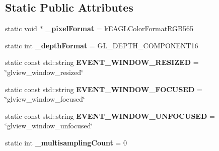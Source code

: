 \subsection*{Static Public Attributes}
\begin{DoxyCompactItemize}
\item 
\mbox{\label{classGLViewImpl_a58e891f79874473b8153a72b04abca33}} 
static void $\ast$ {\bfseries \+\_\+pixel\+Format} = k\+E\+A\+G\+L\+Color\+Format\+R\+G\+B565
\item 
\mbox{\label{classGLViewImpl_ab76f89c8481566f2bd75550cba3edf02}} 
static int {\bfseries \+\_\+depth\+Format} = G\+L\+\_\+\+D\+E\+P\+T\+H\+\_\+\+C\+O\+M\+P\+O\+N\+E\+N\+T16
\item 
\mbox{\label{classGLViewImpl_a90c8299506c7430f38bd9f8602b1ae82}} 
static const std\+::string {\bfseries E\+V\+E\+N\+T\+\_\+\+W\+I\+N\+D\+O\+W\+\_\+\+R\+E\+S\+I\+Z\+ED} = \char`\"{}glview\+\_\+window\+\_\+resized\char`\"{}
\item 
\mbox{\label{classGLViewImpl_aaacceb861875d2fca65f9d213aca00d8}} 
static const std\+::string {\bfseries E\+V\+E\+N\+T\+\_\+\+W\+I\+N\+D\+O\+W\+\_\+\+F\+O\+C\+U\+S\+ED} = \char`\"{}glview\+\_\+window\+\_\+focused\char`\"{}
\item 
\mbox{\label{classGLViewImpl_ae81b16579d07b45d06a8225272798a0e}} 
static const std\+::string {\bfseries E\+V\+E\+N\+T\+\_\+\+W\+I\+N\+D\+O\+W\+\_\+\+U\+N\+F\+O\+C\+U\+S\+ED} = \char`\"{}glview\+\_\+window\+\_\+unfocused\char`\"{}
\item 
\mbox{\label{classGLViewImpl_ad57cca4a1bada2d3cfade12cd0b5514c}} 
static int {\bfseries \+\_\+multisampling\+Count} = 0
\end{DoxyCompactItemize}
